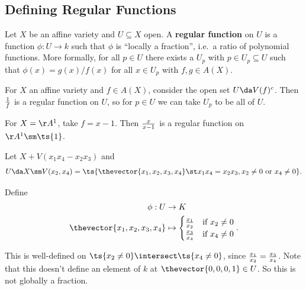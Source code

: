 \hypertarget{defining-regular-functions}{%
\subsection{Defining Regular
Functions}\label{defining-regular-functions}}

\begin{definition}

Let \(X\) be an affine variety and \(U\subseteq X\) open. A
\textbf{regular function} on \(U\) is a function \(\phi: U\to k\) such
that \(\phi\) is ``locally a fraction'', i.e.~a ratio of polynomial
functions. More formally, for all \(p\in U\) there exists a \(U_p\) with
\(p\in U_p \subseteq U\) such that \(\phi(x) = g(x)/ f(x)\) for all
\(x\in U_p\) with \(f, g\in A(X)\).

\end{definition}

\begin{example}

For \(X\) an affine variety and \(f\in A(X)\), consider the open set
\(U\da V(f)^c\). Then \({1\over f}\) is a regular function on \(U\), so
for \(p\in U\) we can take \(U_p\) to be all of \(U\).

\end{example}

\begin{example}

For \(X = \AA^1\), take \(f=x-1\). Then \({x\over x-1}\) is a regular
function on \(\AA^1 \sm\ts{1}\).

\end{example}

\begin{example}

Let \(X + V(x_1 x_4 - x_2 x_3)\) and
\begin{align*}  
U \da X\sm V(x_2, x_4) = \ts{\thevector{x_1, x_2, x_3, x_4} \st x_1 x_4 = x_2 x_3, x_2\neq 0 \text{ or } x_4\neq 0 }
.\end{align*}

Define
\begin{align*}  
\phi: U &\to K \\
\thevector{x_1, x_2, x_3, x_4} &\mapsto
\begin{cases}
{x_1\over x_2} & \text{if } x_2 \neq 0 \\
{x_3\over x_4} & \text{if } x_4 \neq 0
\end{cases}
.\end{align*}

This is well-defined on \(\ts{x_2\neq 0} \intersect \ts{x_4 \neq 0}\),
since \({x_1\over x_2} = {x_3 \over x_4}\). Note that this doesn't
define an element of \(k\) at \(\thevector{0,0,0,1}\in U\). So this is
not globally a fraction.

\end{example}

